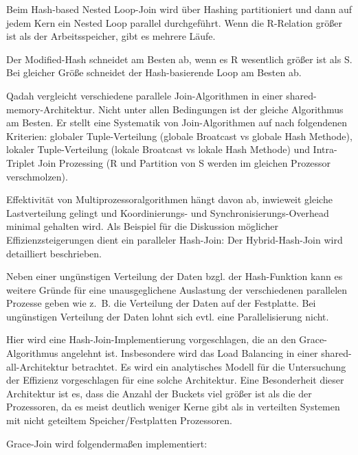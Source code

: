 \documentclass[a4paper,12pt,twoside]{article}
\begin{document}
Beim Hash-based Nested Loop-Join wird über Hashing partitioniert und dann auf jedem Kern ein Nested Loop parallel durchgeführt. Wenn die R-Relation größer ist als der Arbeitsspeicher, gibt es mehrere Läufe.

Der Modified-Hash schneidet am Besten ab, wenn es R wesentlich größer ist als S. Bei gleicher Größe schneidet der Hash-basierende Loop am Besten ab.

\textbf{}

Qadah vergleicht verschiedene parallele Join-Algorithmen in einer shared-memory-Architektur. Nicht unter allen Bedingungen ist der gleiche Algorithmus am Besten. Er stellt eine Systematik von Join-Algorithmen auf nach folgendenen Kriterien: globaler Tuple-Verteilung (globale Broatcast vs globale Hash Methode), lokaler Tuple-Verteilung (lokale Broatcast vs lokale Hash Methode) und Intra-Triplet Join Prozessing (R und Partition von S werden im gleichen Prozessor verschmolzen). 

\textbf{}

Effektivität von Multiprozessoralgorithmen hängt davon ab, inwieweit gleiche Lastverteilung gelingt und Koordinierungs- und Synchronisierungs-Overhead minimal gehalten wird. Als Beispiel für die Diskussion möglicher Effizienzsteigerungen dient ein paralleler Hash-Join: Der Hybrid-Hash-Join wird detailliert beschrieben.

Neben einer ungünstigen Verteilung der Daten bzgl. der Hash-Funktion kann es weitere Gründe für eine unausgeglichene Auslastung der verschiedenen parallelen Prozesse geben wie z.~B. die Verteilung der Daten auf der Festplatte. Bei ungünstigen Verteilung der Daten lohnt sich evtl. eine Parallelisierung nicht.  

\textbf{}

Hier wird eine Hash-Join-Implementierung vorgeschlagen, die an den Grace-Algorithmus angelehnt ist. Insbesondere wird das Load Balancing in einer shared-all-Architektur betrachtet. Es wird ein analytisches Modell für die Untersuchung der Effizienz vorgeschlagen für eine solche Architektur. Eine Besonderheit dieser Architektur ist es, dass die Anzahl der Buckets viel größer ist als die der Prozessoren, da es meist deutlich weniger Kerne gibt als in verteilten Systemen mit nicht geteiltem Speicher/Festplatten Prozessoren. 

Grace-Join wird folgendermaßen implementiert:
\end{document}
